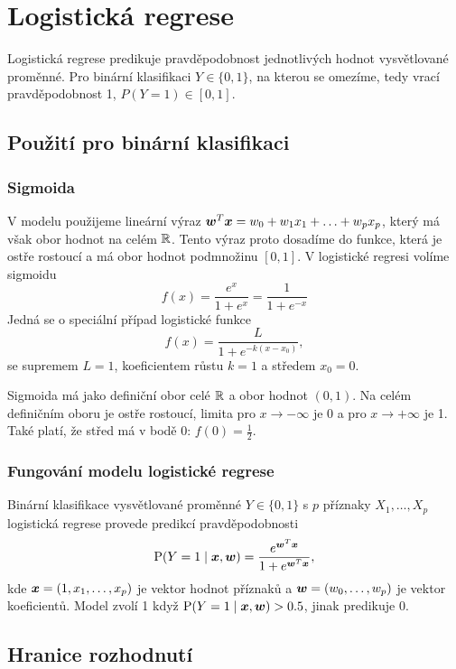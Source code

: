 \documentclass[../main.tex]{subfiles}
\begin{document}
\section{Logistická regrese}

Logistická regrese predikuje pravděpodobnost jednotlivých hodnot vysvětlované proměnné. Pro binární klasifikaci $Y \in \{0, 1\}$, na kterou se omezíme, tedy vrací pravděpodobnost 1, $P(Y = 1) \in [0, 1]$.

\subsection{Použití pro binární klasifikaci}

\subsubsection{Sigmoida}

V modelu použijeme lineární výraz $\bm{w}^T\bm{x} = w_0 + w_1 x_1 + \ldots + w_p x_p$, který má však obor hodnot na celém $\mathbb{R}$. Tento výraz proto dosadíme do funkce, která je ostře rostoucí a má obor hodnot podmnožinu $[0, 1]$. V logistické regresi volíme sigmoidu
\[f(x) = \frac{e^x}{1+e^x} = \frac{1}{1+e^{-x}}\]
Jedná se o speciální případ logistické funkce
\[f(x) = \frac{L}{1 + e^{-k(x-x_0)}},\]
se supremem $L=1$, koeficientem růstu $k=1$ a středem $x_0 = 0$.

Sigmoida má jako definiční obor celé $\mathbb{R}$ a obor hodnot $(0, 1)$. Na celém definičním oboru je ostře rostoucí, limita pro $x \rightarrow -\infty$ je 0 a pro $x \rightarrow +\infty$ je 1. Také platí, že střed má v bodě 0: $f(0) = \frac{1}{2}$.

\subsubsection{Fungování modelu logistické regrese}

Binární klasifikace vysvětlované proměnné $Y \in \{0,1\}$ s $p$ příznaky $X_1, \ldots, X_p$ logistická regrese provede predikcí pravděpodobnosti
\begin{equation*}
    \text{P} (Y=1 \mid \bm{x}, \bm{w} ) = \frac{e^{\bm{w}^T\bm{x}}}{1 + e^{\bm{w}^T\bm{x}}},
\end{equation*}
kde $\bm{x} = (1, x_1, \ldots, x_p)$ je vektor hodnot příznaků a $\bm{w} = (w_0, \ldots, w_p)$ je vektor koeficientů. Model zvolí 1 když $\text{P} (Y=1 \mid \bm{x}, \bm{w} ) > 0.5$, jinak predikuje 0.

\subsection{Hranice rozhodnutí}
\end{document}
